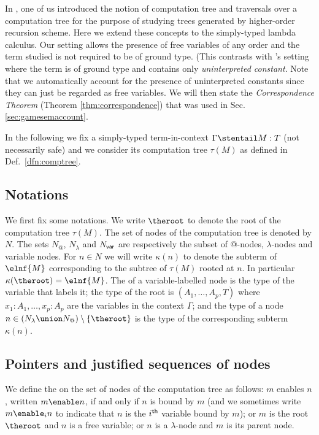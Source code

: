 In \cite{OngLics2006}, one of us introduced the notion of
computation tree and traversals over a computation tree for the
purpose of studying trees generated by higher-order recursion
scheme. Here we extend these concepts to the simply-typed lambda
calculus. Our setting allows the presence of free variables of any
order and the term studied is not required to be of ground type.
(This contrasts with \cite{OngLics2006}'s setting where the term is
of ground type and contains only \emph{uninterpreted
constant}.
Note that we automatically account for the
presence of uninterpreted constants since they can just be regarded
as free variables. We will then state the \emph{Correspondence
Theorem} (Theorem \ref{thm:correspondence}) that was used in Sec.
\ref{sec:gamesemaccount}.

In the following we fix a simply-typed term-in-context $\Gamma \stentail M :T$
(not necessarily safe) and we consider its computation tree
$\tau(M)$ as defined in Def.\ \ref{dfn:comptree}.

\subsection{Notations}
We first fix some notations. We write $\theroot$ to denote the root
of the computation tree $\tau(M)$. The set of nodes of the
computation tree is denoted by $N$. The sets $N_@$, $N_\lambda$ and
$N_{\sf var}$ are respectively the subset of @-nodes,
$\lambda$-nodes and variable nodes. For $n \in N$ we will write
$\kappa(n)$ to denote the subterm of $\elnf{M}$ corresponding to the
subtree of $\tau(M)$ rooted at $n$. In particular $\kappa(\theroot)
= \elnf{M}$. The  of a variable-labelled node is the
type of the variable that labels it; the type of the root is
$(A_1,\ldots,A_p, T)$ where $x_1:A_1,\ldots, x_p:A_p$ are the
variables in the context $\Gamma$; and the type of a node $n\in
(N_\lambda \union N_@) \setminus \{ \theroot \}$ is the type of the
corresponding subterm $\kappa(n)$.


\subsection{Pointers and justified sequences of nodes}

We define the  on the set of nodes of the
computation tree as follows: $m$ enables $n$, written $m \enable n$,
if and only if $n$ is bound by $m$ (and we sometimes write $m
\enable_i n$ to indicate that $n$ is the $i^{\sf th}$ variable bound
by $m$); or $m$ is the root $\theroot$ and $n$ is a free variable;
or $n$ is a $\lambda$-node and $m$ is its parent node.


